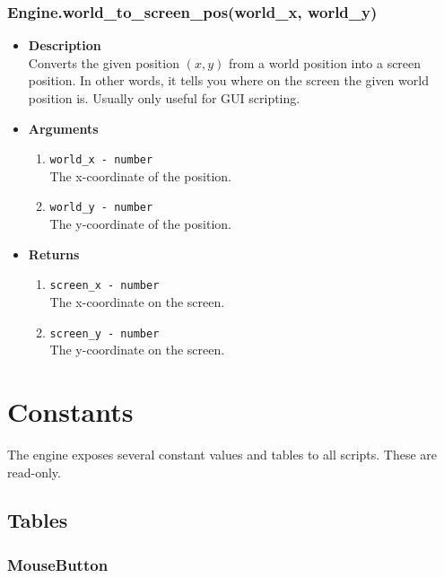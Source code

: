 \documentclass[12pt,a4paper]{article}
\begin{document}
\subsubsection{Engine.world\_to\_screen\_pos(world\_x, world\_y)}
\begin{itemize}
	\item[]{\bf Description}
		\\ Converts the given position $(x, y)$ from a world position into a screen position. In other words, it tells you where on the screen the given world position is. Usually only useful for GUI scripting.
	\item[]{\bf Arguments}
	\begin{enumerate}
		\item{\texttt{world\_x - number}} 
			\\ The x-coordinate of the position.
		\item{\texttt{world\_y - number}} 
			\\ The y-coordinate of the position.
	\end{enumerate}
	\item[]{\bf Returns}
	\begin{enumerate}
		\item{\texttt{screen\_x - number}} 
			\\ The x-coordinate on the screen.
		\item{\texttt{screen\_y - number}} 
			\\ The y-coordinate on the screen.
	\end{enumerate}
\end{itemize}

\pagebreak
\section{Constants}

The engine exposes several constant values and tables to all scripts. These are read-only.
\subsection{Tables}

\subsubsection{MouseButton}\label{MouseButton}
\end{document}
